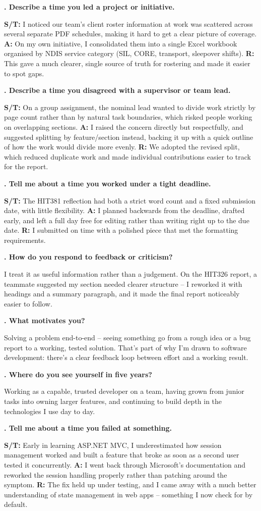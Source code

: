 \documentclass[10.5pt]{article}
\newcounter{qnum}
\newcommand{\qa}[2]{%
  \stepcounter{qnum}%
  \textbf{\theqnum. #1}\par
  #2\par
  \vspace{6pt}
}
\begin{document}
\qa{Describe a time you led a project or initiative.}{\textbf{S/T:} I noticed our team's client roster information at work was scattered across several separate PDF schedules, making it hard to get a clear picture of coverage. \textbf{A:} On my own initiative, I consolidated them into a single Excel workbook organised by NDIS service category (SIL, CORE, transport, sleepover shifts). \textbf{R:} This gave a much clearer, single source of truth for rostering and made it easier to spot gaps.}

\qa{Describe a time you disagreed with a supervisor or team lead.}{\textbf{S/T:} On a group assignment, the nominal lead wanted to divide work strictly by page count rather than by natural task boundaries, which risked people working on overlapping sections. \textbf{A:} I raised the concern directly but respectfully, and suggested splitting by feature/section instead, backing it up with a quick outline of how the work would divide more evenly. \textbf{R:} We adopted the revised split, which reduced duplicate work and made individual contributions easier to track for the report.}

\qa{Tell me about a time you worked under a tight deadline.}{\textbf{S/T:} The HIT381 reflection had both a strict word count and a fixed submission date, with little flexibility. \textbf{A:} I planned backwards from the deadline, drafted early, and left a full day free for editing rather than writing right up to the due date. \textbf{R:} I submitted on time with a polished piece that met the formatting requirements.}

\qa{How do you respond to feedback or criticism?}{I treat it as useful information rather than a judgement. On the HIT326 report, a teammate suggested my section needed clearer structure -- I reworked it with headings and a summary paragraph, and it made the final report noticeably easier to follow.}

\qa{What motivates you?}{Solving a problem end-to-end -- seeing something go from a rough idea or a bug report to a working, tested solution. That's part of why I'm drawn to software development: there's a clear feedback loop between effort and a working result.}

\qa{Where do you see yourself in five years?}{Working as a capable, trusted developer on a team, having grown from junior tasks into owning larger features, and continuing to build depth in the technologies I use day to day.}

\qa{Tell me about a time you failed at something.}{\textbf{S/T:} Early in learning ASP.NET MVC, I underestimated how session management worked and built a feature that broke as soon as a second user tested it concurrently. \textbf{A:} I went back through Microsoft's documentation and reworked the session handling properly rather than patching around the symptom. \textbf{R:} The fix held up under testing, and I came away with a much better understanding of state management in web apps -- something I now check for by default.}
\end{document}
